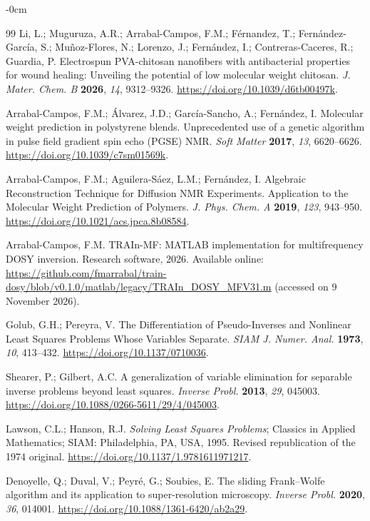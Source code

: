 \documentclass[mathematics,article,accept,moreauthors]{Definitions/mdpi}
\begin{document}
\begin{adjustwidth}{-\extralength}{0cm}
\begin{thebibliography}{99}
Li, L.; Muguruza, A.R.; Arrabal-Campos, F.M.; Férnandez, T.; Fernández-García, S.; Muñoz-Flores, N.; Lorenzo, J.; Fernández, I.; Contreras-Caceres, R.; Guardia, P. Electrospun PVA-chitosan nanofibers with antibacterial properties for wound healing: Unveiling the potential of low molecular weight chitosan. \emph{J. Mater. Chem. B} \textbf{2026}, \emph{14}, 9312--9326. \url{https://doi.org/10.1039/d6tb00497k}.

Arrabal-Campos, F.M.; Álvarez, J.D.; García-Sancho, A.; Fernández, I. Molecular weight prediction in polystyrene blends. Unprecedented use of a genetic algorithm in pulse field gradient spin echo (PGSE) NMR. \emph{Soft Matter} \textbf{2017}, \emph{13}, 6620--6626. \url{https://doi.org/10.1039/c7sm01569k}.

Arrabal-Campos, F.M.; Aguilera-Sáez, L.M.; Fernández, I. Algebraic Reconstruction Technique for Diffusion NMR Experiments. Application to the Molecular Weight Prediction of Polymers. \emph{ J. Phys. Chem. A} \textbf{2019}, \emph{123}, 943--950. \url{https://doi.org/10.1021/acs.jpca.8b08584}.

Arrabal-Campos, F.M. TRAIn-MF: MATLAB implementation for multifrequency DOSY inversion. Research software, 2026. Available online: \url{https://github.com/fmarrabal/train-dosy/blob/v0.1.0/matlab/legacy/TRAIn_DOSY_MFV31.m} (accessed on 9 November 2026).

Golub, G.H.; Pereyra, V. The Differentiation of Pseudo-Inverses and Nonlinear Least Squares Problems Whose Variables Separate. \emph{SIAM J. Numer. Anal.} \textbf{1973}, \emph{10}, 413--432. \url{https://doi.org/10.1137/0710036}.

Shearer, P.; Gilbert, A.C. A generalization of variable elimination for separable inverse problems beyond least squares. \emph{Inverse Probl.} \textbf{2013}, \emph{29}, 045003. \url{https://doi.org/10.1088/0266-5611/29/4/045003}.

Lawson, C.L.; Hanson, R.J. \emph{Solving Least Squares Problems}; Classics in Applied Mathematics; SIAM: Philadelphia, PA, USA, 1995. Revised republication of the 1974 original. 
 \url{https://doi.org/10.1137/1.9781611971217}.

Denoyelle, Q.; Duval, V.; Peyr\'e, G.; Soubies, E. The sliding Frank--Wolfe algorithm and its application to super-resolution microscopy. \emph{Inverse Probl.} \textbf{2020}, \emph{36}, 014001. \url{https://doi.org/10.1088/1361-6420/ab2a29}.


\end{thebibliography}
\end{adjustwidth}
\end{document}
